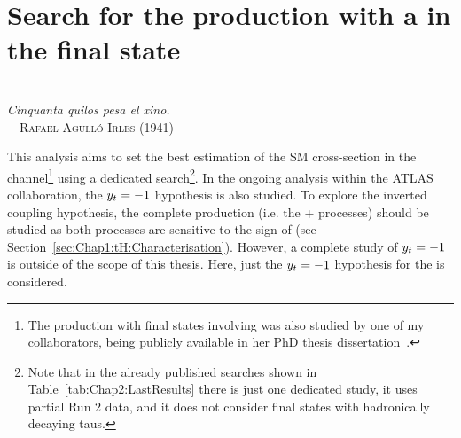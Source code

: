 \begin{comment}
%
%
asdf
\end{comment}

\chapter{Search for the \tHq production with a \tauhad in the final state}

\label{chap:Analysis_tH}
\vspace*{0.1 cm} 
\hspace*{200pt} \\
\hspace*{120pt} \textit{Cinquanta quilos pesa el xino.} \\
\hspace*{140pt} ---\textsc{Rafael Agulló-Irles (1941)} \\%
\vspace*{2cm} 


This analysis aims to set the best estimation of the \tHq%
SM cross-section in the \dileptau channel\footnote{The \tHq production with final states involving \tauhad  was also studied
by one of my collaborators, being publicly available in her PhD thesis dissertation~\cite{ThesisTanja}.} using a 
dedicated search\footnote{Note that in the already published searches shown in 
Table~\ref{tab:Chap2:LastResults} there is just one dedicated \tHq study, it uses partial Run 2 data, and it does not consider final states with hadronically
decaying taus.}.
In the ongoing analysis within the ATLAS collaboration, the $y_{t} = -1$ hypothesis is also studied. 
To explore  the inverted coupling hypothesis, the complete \tH production (i.e. the \tHq + \tWH processes) should be studied 
as both processes are sensitive to the sign of \yt (see Section~\ref{sec:Chap1:tH:Characterisation}).
However, a complete study of $y_{t} = -1$ is outside of the scope of this thesis.
Here, just the $y_{t} = -1$ hypothesis for the \tHq is considered. 

